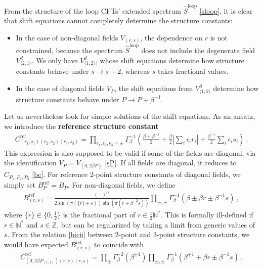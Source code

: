 \documentclass[12pt, a4paper]{article}
\newcommand{\myindex}[1]{\textbf{\boldmath #1}}
\theoremstyle{break}
\begin{document}
From the structure of the loop CFTs' extended spectrum $\widehat{S}^\text{loop}$ \eqref{sloop}, it is clear that shift equations cannot completely determine the structure constants:
\begin{itemize}
 \item In the case of non-diagonal fields $V_{(r,s)}$, the dependence on $r$ is not constrained, because the spectrum $\widehat{S}^\text{loop}$ does not include the degenerate field $V_{\langle 2,1\rangle}^d$. We only have $V^d_{\langle 1,2\rangle}$, whose shift equations determine how structure constants behave under $s\to s+2$, whereas $s$ takes fractional values.
 \item In the case of diagonal fields $V_P$, the shift equations from $V^d_{\langle 1,2\rangle}$ determine how structure constants behave under $P\to P+\beta^{-1}$. 
\end{itemize}
Let us nevertheless look for simple solutions of the shift equations. As an ansatz, we introduce the \myindex{reference structure constant}
\begin{align}
\boxed{C^\text{ref}_{(r_1,s_1)(r_2,s_2)(r_3,s_3)} =\prod_{\epsilon_1,\epsilon_2,\epsilon_3=\pm} \Gamma_\beta^{-1} \left(\tfrac{\beta+\beta^{-1}}{2} + \tfrac{\beta}{2}\left|\textstyle{\sum_i} \epsilon_ir_i\right| + \tfrac{\beta^{-1}}{2}\textstyle{\sum_i} \epsilon_is_i\right)}\ .
 \label{cref}
\end{align}
This expression is also supposed to be valid if some of the fields are diagonal, via the identification $V_P = V_{(0,2\beta P)}$ \eqref{sP}. If all fields are diagonal, it reduces to $C_{P_1,P_2,P_3}$ \eqref{bc}. 
For reference 2-point structure constants of diagonal fields, we simply set $B^\text{ref}_P = B_P$. For non-diagonal fields, we define 
\begin{align}
 \boxed{B^\text{ref}_{(r,s)} = \frac{(-)^{rs}}{2\sin\left(\pi(\{r\}+s)\right)\sin\left(\pi(r+\beta^{-2}s)\right)}\prod_{\pm,\pm}\Gamma_\beta^{-1}\left(\beta\pm \beta r \pm \beta^{-1}s\right)} \ ,
 \label{bref}
 \end{align}
 where $\{r\}\in\{0,\frac12\}$ is the fractional part of $r\in\frac12\mathbb{N}^*$. This is formally ill-defined if $r\in\mathbb{N}^*$ and $s\in\mathbb{Z}$, but can be regularized by taking a limit from generic values of $s$. 
 From the relation \eqref{bicii} between 2-point and 3-point structure constants, we would have expected $B^\text{ref}_{(r,s)}$ to coincide with 
 \begin{align}
  C^\text{ref}_{(0,2\beta P_{(1,1)})(r,s)(r,s)} =  \prod_\pm \Gamma_\beta^{-2}\left(\beta^{\pm 1}\right)\prod_{\pm,\pm}\Gamma_\beta^{-1}\left(\beta^{\pm 1}+\beta r \pm \beta^{-1}s\right)  \ .
  \label{cref0}
 \end{align}
\end{document}
